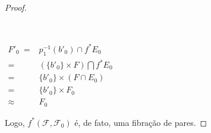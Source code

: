 \documentclass[12pt,oneside]{book} %
\begin{document}
\begin{proof}
	\
	
	\
	
	$\begin{array}{rl}
		F'_{0} \ = & p_{1}^{-1}(b'_{0})\cap f^{*}E_{0} \\
		= & (\{ b'_{0} \}\times F)\bigcap f^{*}E_{0} \\
		= & \{ b'_{0} \}\times (F\cap E_{0}) \\
		= & \{ b'_{0} \}\times F_{0} \\
		\approx & F_{0}
	\end{array}$ \newline
	
	\par Logo, $f^{*}(\mathcal{F},\mathcal{F}_{0})$ é, de fato, uma fibração de pares.
	
\end{proof}
\end{document}
